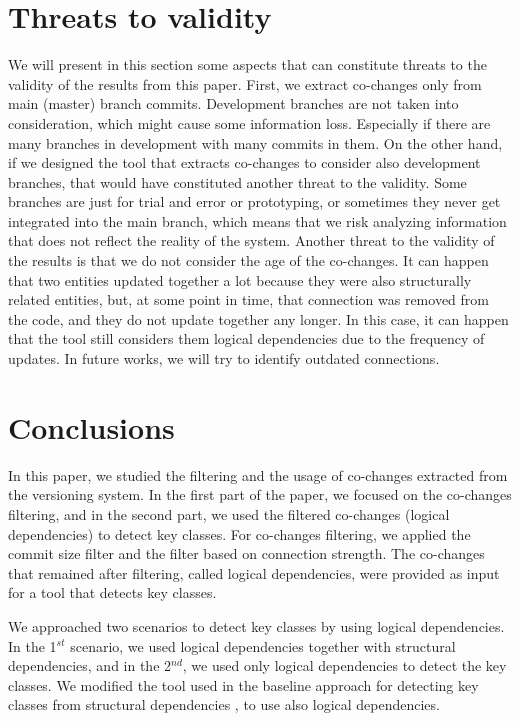 \documentclass[runningheads]{comsis2}
\begin{document}
\section{Threats to validity}
\label{sec:threats}
We will present in this section some aspects that can constitute threats to the validity of the results from this paper. First, we extract co-changes only from main (master) branch commits. Development branches are not taken into consideration, which might cause some information loss. Especially if there are many branches in development with many commits in them. On the other hand, if we designed the tool that extracts co-changes to consider also development branches, that would have constituted another threat to the validity. Some branches are just for trial and error or prototyping, or sometimes they never get integrated into the main branch, which means that we risk analyzing information that does not reflect the reality of the system.
Another threat to the validity of the results is that we do not consider the age of the co-changes. It can happen that two entities updated together a lot because they were also structurally related entities, but, at some point in time, that connection was removed from the code, and they do not update together any longer. In this case, it can happen that the tool still considers them logical dependencies due to the frequency of updates. In future works, we will try to identify outdated connections. 

\section{Conclusions}
\label{sec:conclusion}

In this paper, we studied the filtering and the usage of co-changes extracted from the versioning system. In the first part of the paper, we focused on the co-changes filtering, and in the second part, we used the filtered co-changes (logical dependencies) to detect key classes.
For co-changes filtering, we applied the commit size filter and the filter based on connection strength. The co-changes that remained after filtering, called logical dependencies, were provided as input for a tool that detects key classes. 

We approached two scenarios to detect key classes by using logical dependencies. In the 1$^{st}$ scenario, we used logical dependencies together with structural dependencies, and in the 2$^{nd}$, we used only logical dependencies to detect the key classes. We modified the tool used in the baseline approach for detecting key classes from structural dependencies \cite{Finding-key-classes}, to use also logical dependencies.
\end{document}
